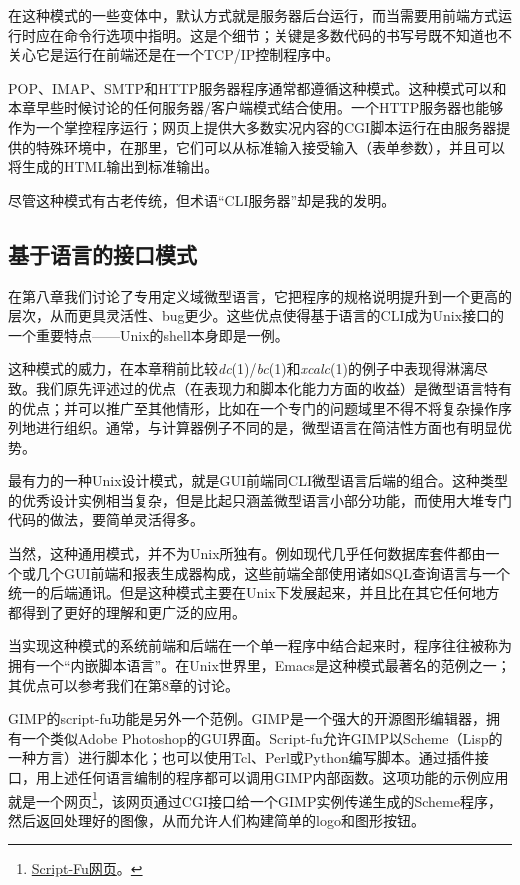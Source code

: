\documentclass[12pt,oneside]{book}
\begin{document}
在这种模式的一些变体中，默认方式就是服务器后台运行，而当需要用前端方式运行时应在命令行选项中指明。这是个细节；关键是多数代码的书写号既不知道也不关心它是运行在前端还是在一个TCP/IP控制程序中。

POP、IMAP、SMTP和HTTP服务器程序通常都遵循这种模式。这种模式可以和本章早些时候讨论的任何服务器/客户端模式结合使用。一个HTTP服务器也能够作为一个掌控程序运行；网页上提供大多数实况内容的CGI脚本运行在由服务器提供的特殊环境中，在那里，它们可以从标准输入接受输入（表单参数），并且可以将生成的HTML输出到标准输出。

尽管这种模式有古老传统，但术语“CLI服务器”却是我的发明。

\subsection{基于语言的接口模式}
在第八章我们讨论了专用定义域微型语言，它把程序的规格说明提升到一个更高的层次，从而更具灵活性、bug更少。这些优点使得基于语言的CLI成为Unix接口的一个重要特点——Unix的shell本身即是一例。

这种模式的威力，在本章稍前比较\textit{dc}(1)/\textit{bc}(1)和\textit{xcalc}(1)的例子中表现得淋漓尽致。我们原先评述过的优点（在表现力和脚本化能力方面的收益）是微型语言特有的优点；并可以推广至其他情形，比如在一个专门的问题域里不得不将复杂操作序列地进行组织。通常，与计算器例子不同的是，微型语言在简洁性方面也有明显优势。

最有力的一种Unix设计模式，就是GUI前端同CLI微型语言后端的组合。这种类型的优秀设计实例相当复杂，但是比起只涵盖微型语言小部分功能，而使用大堆专门代码的做法，要简单灵活得多。

当然，这种通用模式，并不为Unix所独有。例如现代几乎任何数据库套件都由一个或几个GUI前端和报表生成器构成，这些前端全部使用诸如SQL查询语言与一个统一的后端通讯。但是这种模式主要在Unix下发展起来，并且比在其它任何地方都得到了更好的理解和更广泛的应用。

当实现这种模式的系统前端和后端在一个单一程序中结合起来时，程序往往被称为拥有一个“内嵌脚本语言”。在Unix世界里，Emacs是这种模式最著名的范例之一；其优点可以参考我们在第8章的讨论。

GIMP的script-fu功能是另外一个范例。GIMP是一个强大的开源图形编辑器，拥有一个类似Adobe Photoshop的GUI界面。Script-fu允许GIMP以Scheme（Lisp的一种方言）进行脚本化；也可以使用Tcl、Perl或Python编写脚本。通过插件接口，用上述任何语言编制的程序都可以调用GIMP内部函数。这项功能的示例应用就是一个网页\footnote{\href{http://www.xcf.berkeley.edu/~gimp/script-fu/script-fu.html}{Script-Fu网页}。}，该网页通过CGI接口给一个GIMP实例传递生成的Scheme程序，然后返回处理好的图像，从而允许人们构建简单的logo和图形按钮。
\end{document}
